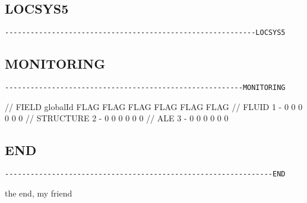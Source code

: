 

\subsection{LOCSYS5}
\begin{verbatim}
-----------------------------------------------------------LOCSYS5
\end{verbatim}




\subsection{MONITORING}
\begin{verbatim}
--------------------------------------------------------MONITORING
\end{verbatim}

// FIELD globalId FLAG FLAG FLAG FLAG FLAG FLAG
// FLUID 1 - 0 0 0 0 0 0 
// STRUCTURE 2 - 0 0 0 0 0 0 
// ALE 3 - 0 0 0 0 0 0 

\subsection{END}
\begin{verbatim}
---------------------------------------------------------------END
\end{verbatim}
the end, my friend



